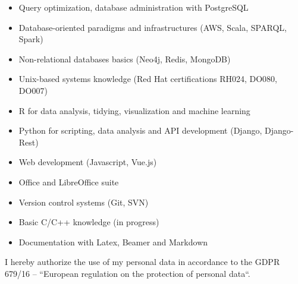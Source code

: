 \documentclass[10pt, a4paper, roman]{moderncv}        %
\begin{document}
\begin{itemize}

\item Query optimization, database administration with PostgreSQL

\vspace{1pt}

\item Database-oriented paradigms and infrastructures (AWS, Scala, SPARQL, Spark)

\vspace{1pt}

\item Non-relational databases basics (Neo4j, Redis, MongoDB)

\vspace{1pt}

\item Unix-based systems knowledge (Red Hat certifications RH024, DO080, DO007)

\vspace{1pt}

\item R for data analysis, tidying, visualization and machine learning

\vspace{1pt}

\item Python for scripting, data analysis and API development (Django, Django-Rest)

\vspace{1pt}

\item Web development (Javascript, Vue.js)

\vspace{1pt}

\item Office and LibreOffice suite

\vspace{1pt}

\item Version control systems (Git, SVN)

\vspace{1pt}

\item Basic C/C++ knowledge (in progress)

\vspace{1pt}

\item Documentation with Latex, Beamer and Markdown

\end{itemize}

\vspace{110pt}
I hereby authorize the use of my personal data in accordance to the GDPR 679/16 – “European regulation on the protection of personal data``.
\end{document}
